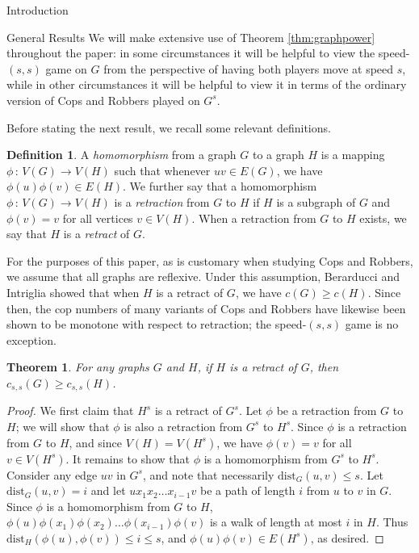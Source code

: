 \documentclass[12pt]{amsart}
\newtheorem{theorem}[lemma]{Theorem}
\theoremstyle{definition}
\newtheorem{definition}[lemma]{Definition}
\newcommand{\speeds}{c_{s,s}}
\begin{document}
\begin{section}{Introduction}
\begin{section}{General Results}
We will make extensive use of Theorem \ref{thm:graphpower} throughout the paper: in some circumstances it will be helpful to view the speed-$(s,s)$ game on $G$ from the perspective of having both players move at speed $s$, while in other circumstances it will be helpful to view it in terms of the ordinary version of Cops and Robbers played on $G^s$. 

Before stating the next result, we recall some relevant definitions.
\begin{definition}\label{def:retraction}
    A \textit{homomorphism} from a graph $G$ to a graph $H$ is a mapping $\phi \, : \, V(G) \rightarrow V(H)$ such that whenever $uv \in E(G)$, we have $\phi(u)\phi(v) \in E(H)$.  We further say that a homomorphism $\phi\, : \, V(G) \rightarrow V(H)$ is a \textit{retraction} from $G$ to $H$ if $H$ is a subgraph of $G$ and $\phi(v)=v$ for all vertices $v\in V(H)$.  When a retraction from $G$ to $H$ exists, we say that $H$ is a \textit{retract} of $G$.
\end{definition}

For the purposes of this paper, as is customary when studying Cops and Robbers, we assume that all graphs are reflexive.  Under this assumption, Berarducci and Intriglia \cite{BI93} showed that when $H$ is a retract of $G$, we have $c(G) \ge c(H)$.  Since then, the cop numbers of many variants of Cops and Robbers have likewise been shown to be monotone with respect to retraction; the speed-$(s,s)$ game is no exception.

\begin{theorem}\label{thm:retract}
For any graphs $G$ and $H$, if $H$ is a retract of $G$, then $\speeds(G) \ge \speeds(H)$.
\end{theorem}
\begin{proof}
We first claim that $H^s$ is a retract of $G^s$.  Let $\phi$ be a retraction from $G$ to $H$; we will show that $\phi$ is also a retraction from $G^s$ to $H^s$.  Since $\phi$ is a retraction from $G$ to $H$, and since $V(H) = V(H^s)$, we have $\phi(v)=v$ for all $v\in V(H^s)$.  It remains to show that $\phi$ is a homomorphism from $G^s$ to $H^s$.  Consider any edge $uv$ in $G^s$, and note that necessarily $\textrm{dist}_G(u,v)\le s$.  Let $\textrm{dist}_G(u,v)=i$ and let $u x_1x_2\dots x_{i-1}v$ be a path of length $i$ from $u$ to $v$ in $G$.  Since $\phi$ is a homomorphism from $G$ to $H$, $\phi(u)\phi(x_1)\phi(x_2)\dots\phi(x_{i-1})\phi(v)$ is a walk of length at most $i$ in $H$. Thus $\textrm{dist}_H(\phi(u),\phi(v))\le i\le s$, and $\phi(u)\phi(v)\in E(H^s)$, as desired.


\end{proof}
\end{section}
\end{section}
\end{document}
